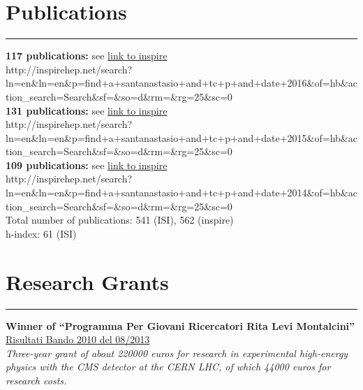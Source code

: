\documentclass[10pt, a4paper]{article}
\newcommand{\years}[1]{\marginnote{\hskip-0.2in{\small #1}}}
\begin{document}
\section*{Publications}
\vspace{-5pt}
\hrule
\vspace{10pt}
\years{2016}\textbf{117 publications:} see
\href{http://inspirehep.net/search?ln=en&ln=en&p=find+a+santanastasio+and+tc+p+and+date+2016&of=hb&action_search=Search&sf=&so=d&rm=&rg=25&sc=0}{link
  to inspire}\\
{\tiny
  http://inspirehep.net/search?ln=en\&ln=en\&p=find+a+santanastasio+and+tc+p+and+date+2016\&of=hb\&action\_search=Search\&sf=\&so=d\&rm=\&rg=25\&sc=0}\\[1em]\normalsize
\years{2015}\textbf{131 publications:} see
\href{http://inspirehep.net/search?ln=en&ln=en&p=find+a+santanastasio+and+tc+p+and+date+2015&of=hb&action_search=Search&sf=&so=d&rm=&rg=25&sc=0}{link
  to inspire}\\
{\tiny
  http://inspirehep.net/search?ln=en\&ln=en\&p=find+a+santanastasio+and+tc+p+and+date+2015\&of=hb\&action\_search=Search\&sf=\&so=d\&rm=\&rg=25\&sc=0}\\[1em]\normalsize
\years{2014}\textbf{109 publications:} see
\href{http://inspirehep.net/search?ln=en&ln=en&p=find+a+santanastasio+and+tc+p+and+date+2014&of=hb&action_search=Search&sf=&so=d&rm=&rg=25&sc=0}{link
  to inspire}\\
{\tiny
  http://inspirehep.net/search?ln=en\&ln=en\&p=find+a+santanastasio+and+tc+p+and+date+2014\&of=hb\&action\_search=Search\&sf=\&so=d\&rm=\&rg=25\&sc=0}\normalsize \\

Total number of publications: 541 (ISI), 562 (inspire) \\
h-index: 61 (ISI) 

\section*{Research Grants}
\vspace{-5pt}
\hrule
\vspace{10pt}
\years{03/2014}\textbf{Winner of ``Programma Per Giovani
  Ricercatori Rita Levi Montalcini''} \\ 
 \href{http://cervelli.cineca.it/ProgGiovRic/dm050813_683.pdf}{Risultati
   Bando 2010 del 08/2013} \\
\emph{Three-year grant of about 220000 euros for research in experimental high-energy
  physics with the CMS detector at the CERN LHC, of which 44000 euros for research costs.}
\end{document}

